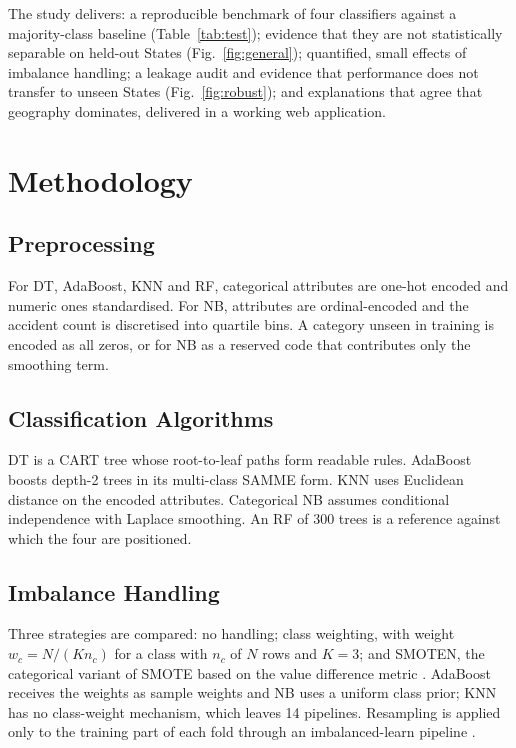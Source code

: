 \documentclass[conference]{IEEEtran}
\begin{document}
The study delivers: a reproducible benchmark of four classifiers against a majority-class baseline (Table~\ref{tab:test}); evidence that they are not statistically separable on held-out States (Fig.~\ref{fig:general}); quantified, small effects of imbalance handling; a leakage audit and evidence that performance does not transfer to unseen States (Fig.~\ref{fig:robust}); and explanations that agree that geography dominates, delivered in a working web application.

\section{Methodology}
\label{sec:method}

\subsection{Preprocessing}
For DT, AdaBoost, KNN and RF, categorical attributes are one-hot encoded and numeric ones standardised. For NB, attributes are ordinal-encoded and the accident count is discretised into quartile bins. A category unseen in training is encoded as all zeros, or for NB as a reserved code that contributes only the smoothing term.

\subsection{Classification Algorithms}
DT is a CART tree \cite{breiman1984} whose root-to-leaf paths form readable rules. AdaBoost \cite{freund1997} boosts depth-2 trees in its multi-class SAMME form. KNN \cite{cover1967} uses Euclidean distance on the encoded attributes. Categorical NB assumes conditional independence with Laplace smoothing. An RF \cite{breiman2001} of 300 trees is a reference against which the four are positioned.

\subsection{Imbalance Handling}
Three strategies are compared: no handling; class weighting, with weight $w_c = N/(K n_c)$ for a class with $n_c$ of $N$ rows and $K = 3$; and SMOTEN, the categorical variant of SMOTE \cite{chawla2002} based on the value difference metric \cite{stanfill1986}. AdaBoost receives the weights as sample weights and NB uses a uniform class prior; KNN has no class-weight mechanism, which leaves 14 pipelines. Resampling is applied only to the training part of each fold through an imbalanced-learn pipeline \cite{lemaitre2017}.
\end{document}
